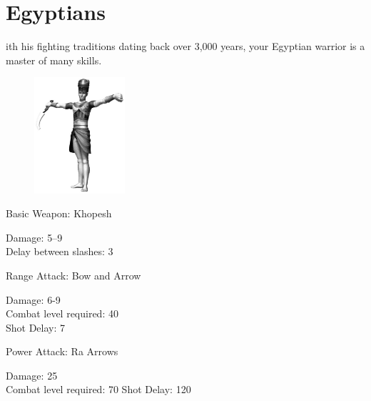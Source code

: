 \clearpage

\section{Egyptians}


ith his fighting traditions dating back over 3,000 years, your Egyptian warrior is a master of many skills.

\begin{figure}
	\begin{center}
		\vspace{-20pt}
		\includegraphics[width=0.3\textwidth]{Aegyptian}
	\end{center}
	\vspace{-20pt}
\end{figure}

Basic Weapon: Khopesh
\begin{adjustwidth}{1cm}{}
	Damage: 5–9 \\
	Delay between slashes: 3
	\end{adjustwidth}
Range Attack: Bow and Arrow
\begin{adjustwidth}{1cm}{}
	Damage: 6-9 \\
	Combat level required: 40 \\
	Shot Delay: 7
\end{adjustwidth}
Power Attack: Ra Arrows
\begin{adjustwidth}{1cm}{}
	Damage: 25 \\
	Combat level required: 70
	Shot Delay: 120 \\
\end{adjustwidth}

